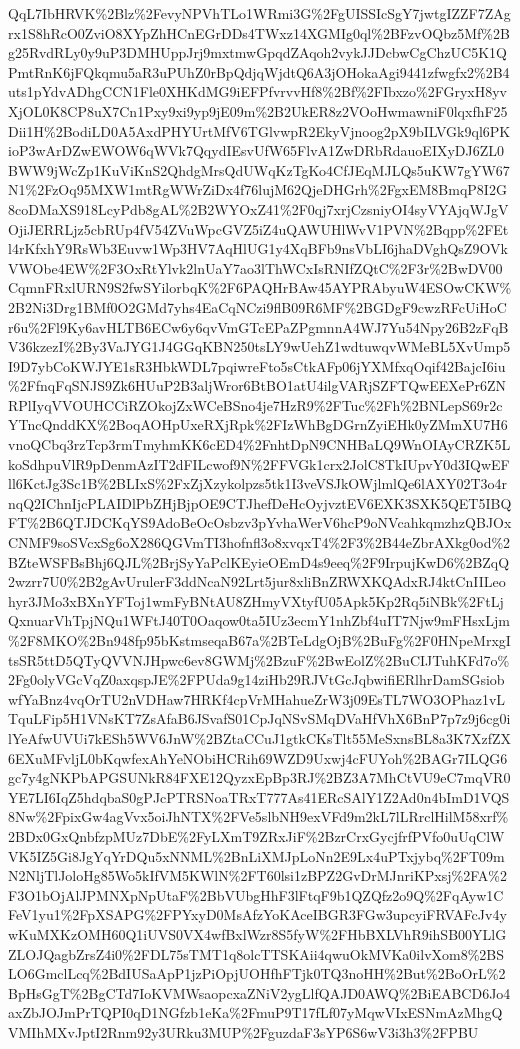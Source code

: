 \documentclass[12pt,letterpaper]{article}
\begin{document}
{\begin{landscape}
\begin{center}
QqL7IbHRVK\%2Blz\%2FevyNPVhTLo1WRmi3G\%2FgUISSIcSgY7jwtgIZZF7ZAgrx1S8hRcO0ZviO8XYpZhHCnEGrDDs4TWxz14XGMIg0ql\%2BFzvOQbz5Mf\%2Bg25RvdRLy0y9uP3DMHUppJrj9mxtmwGpqdZAqoh2vykJJDcbwCgChzUC5K1QPmtRnK6jFQkqmu5aR3uPUhZ0rBpQdjqWjdtQ6A3jOHokaAgi9441zfwgfx2\%2B4uts1pYdvADhgCCN1Fle0XHKdMG9iEFPfvrvvHf8\%2Bf\%2FIbxzo\%2FGryxH8yvXjOL0K8CP8uX7Cn1Pxy9xi9yp9jE09m\%2B2UkER8z2VOoHwmawniF0lqxfhF25Dii1H\%2BodiLD0A5AxdPHYUrtMfV6TGlvwpR2EkyVjnoog2pX9bILVGk9ql6PKioP3wArDZwEWOW6qWVk7QqydIEsvUfW65FlvA1ZwDRbRdauoEIXyDJ6ZL0BWW9jWcZp1KuViKnS2QhdgMrsQdUWqKzTgKo4CfJEqMJLQs5uKW7gYW67N1\%2FzOq95MXW1mtRgWWrZiDx4f76lujM62QjeDHGrh\%2FgxEM8BmqP8I2G8coDMaXS918LcyPdb8gAL\%2B2WYOxZ41\%2F0qj7xrjCzsniyOI4syVYAjqWJgVOjiJERRLjz5cbRUp4fV54ZVuWpcGVZ5iZ4uQAWUHlWvV1PVN\%2Bqpp\%2FEtl4rKfxhY9RsWb3Euvw1Wp3HV7AqHlUG1y4XqBFb9nsVbLI6jhaDVghQsZ9OVkVWObe4EW\%2F3OxRtYlvk2lnUaY7ao3lThWCxIsRNIfZQtC\%2F3r\%2BwDV00CqmnFRxlURN9S2fwSYilorbqK\%2F6PAQHrBAw45AYPRAbyuW4ESOwCKW\%2B2Ni3Drg1BMf0O2GMd7yhs4EaCqNCzi9flB09R6MF\%2BGDgF9cwzRFcUiHoCr6u\%2Fl9Ky6avHLTB6ECw6y6qvVmGTcEPaZPgmnnA4WJ7Yu54Npy26B2zFqBV36kzezI\%2By3VaJYG1J4GGqKBN250tsLY9wUehZ1wdtuwqvWMeBL5XvUmp5I9D7ybCoKWJYE1sR3HbkWDL7pqiwreFto5sCtkAFp06jYXMfxqOqif42BajcI6iu\%2FfnqFqSNJS9Zk6HUuP2B3aljWror6BtBO1atU4ilgVARjSZFTQwEEXePr6ZNRPlIyqVVOUHCCiRZOkojZxWCeBSno4je7HzR9\%2FTuc\%2Fh\%2BNLepS69r2cYTncQnddKX\%2BoqAOHpUxeRXjRpk\%2FIzWhBgDGrnZyiEHk0yZMmXU7H6vnoQCbq3rzTcp3rmTmyhmKK6cED4\%2FnhtDpN9CNHBaLQ9WnOIAyCRZK5LkoSdhpuVlR9pDenmAzIT2dFILcwof9N\%2FFVGk1crx2JolC8TkIUpvY0d3IQwEFll6KctJg3Sc1B\%2BLIxS\%2FxZjXzykolpzs5tk1I3veVSJkOWjlmlQe6lAXY02T3o4rnqQ2IChnIjcPLAIDlPbZHjBjpOE9CTJhefDeHcOyjvztEV6EXK3SXK5QET5IBQFT\%2B6QTJDCKqYS9AdoBeOcOsbzv3pYvhaWerV6hcP9oNVcahkqmzhzQBJOxCNMF9soSVcxSg6oX286QGVmTI3hofnfl3o8xvqxT4\%2F3\%2B44eZbrAXkg0od\%2BZteWSFBsBhj6QJL\%2BrjSyYaPclKEyieOEmD4s9eeq\%2F9IrpujKwD6\%2BZqQ2wzrr7U0\%2B2gAvUrulerF3ddNcaN92Lrt5jur8xliBnZRWXKQAdxRJ4ktCnIILeohyr3JMo3xBXnYFToj1wmFyBNtAU8ZHmyVXtyfU05Apk5Kp2Rq5iNBk\%2FtLjQxnuarVhTpjNQu1WFtJ40T0Oaqow0ta5IUz3ecmY1nhZbf4uIT7Njw9mFHsxLjm\%2F8MKO\%2Bn948fp95bKstmseqaB67a\%2BTeLdgOjB\%2BuFg\%2F0HNpeMrxgItsSR5ttD5QTyQVVNJHpwc6ev8GWMj\%2BzuF\%2BwEolZ\%2BuCIJTuhKFd7o\%2Fg0olyVGcVqZ0axqspJE\%2FPUda9g14ziHb29RJVtGcJqbwifiERlhrDamSGsiobwfYaBnz4vqOrTU2nVDHaw7HRKf4cpVrMHahueZrW3j09EsTL7WO3OPhaz1vLTquLFip5H1VNsKT7ZsAfaB6JSvafS01CpJqNSvSMqDVaHfVhX6BnP7p7z9j6cg0ilYeAfwUVUi7kESh5WV6JnW\%2BZtaCCuJ1gtkCKsTlt55MeSxnsBL8a3K7XzfZX6EXuMFvljL0bKqwfexAhYeNObiHCRih69WZD9Uxwj4cFUYoh\%2BAGr7ILQG6gc7y4gNKPbAPGSUNkR84FXE12QyzxEpBp3RJ\%2BZ3A7MhCtVU9eC7mqVR0YE7LI6IqZ5hdqbaS0gPJcPTRSNoaTRxT777As41ERcSAlY1Z2Ad0n4bImD1VQS8Nw\%2FpixGw4agVvx5oiJhNTX\%2FVe5slbNH9exVFd9m2kL7lLRrclHilM58xrf\%2BDx0GxQnbfzpMUz7DbE\%2FyLXmT9ZRxJiF\%2BzrCrxGycjfrfPVfo0uUqClWVK5IZ5Gi8JgYqYrDQu5xNNML\%2BnLiXMJpLoNn2E9Lx4uPTxjybq\%2FT09mN2NljTlJoloHg85Wo5kIfVM5KWlN\%2FT60lsi1zBPZ2GvDrMJnriKPxsj\%2FA\%2F3O1bOjAlJPMNXpNpUtaF\%2BbVUbgHhF3lFtqF9b1QZQfz2o9Q\%2FqAyw1CFeV1yu1\%2FpXSAPG\%2FPYxyD0MsAfzYoKAceIBGR3FGw3upcyiFRVAFcJv4ywKuMXKzOMH60Q1iUVS0VX4wfBxlWzr8S5fyW\%2FHbBXLVhR9ihSB00YLlGZLOJQagbZrsZ4i0\%2FDL75sTMT1q8olcTTSKAii4qwuOkMVKa0ilvXom8\%2BSLO6GmclLcq\%2BdIUSaApP1jzPiOpjUOHfhFTjk0TQ3noHH\%2But\%2BoOrL\%2BpHsGgT\%2BgCTd7IoKVMWsaopcxaZNiV2ygLlfQAJD0AWQ\%2BiEABCD6Jo4axZbJOJmPrTQPI0qD1NGfzb1eKa\%2FmuP9T17fLf07yMqwVIxESNmAzMhgQVMIhMXvJptI2Rnm92y3URku3MUP\%2FguzdaF3sYP6S6wV3i3h3\%2FPBU
\end{center}
\end{landscape}}
\end{document}
